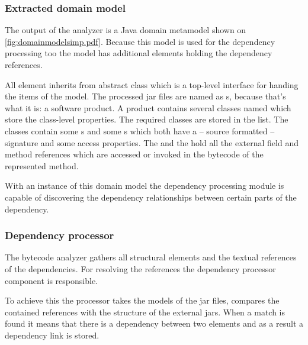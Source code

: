 \subsubsection{Extracted domain model}
The output of the analyzer is a Java domain metamodel shown on
\autoref{fig:domainmodelsimp.pdf}. Because this model is used for the
dependency processing too the model has additional elements holding the
dependency references.

All element inherits from abstract  class which is a top-level
interface for handing the items of the model. The processed jar files are named
as s, because that's what it is: a software product. A product
contains several classes named  which store the class-level
properties. The required classes are stored in the 
list. The classes contain some s and some s which both
have a -- source formatted -- signature and some access properties. The
 and the  hold all the external
field and method references which are accessed or invoked in the bytecode of the
represented method.

With an instance of this domain model the dependency processing module is
capable of discovering the dependency relationships between certain parts of the
dependency.
 

\subsubsection{Dependency processor}
The bytecode analyzer gathers all structural elements and the textual references
of the dependencies. For resolving the references the dependency processor
component is responsible.

To achieve this the processor takes the models of the jar files, compares the
contained references with the structure of the external jars. When a match is
found it means that there is a dependency between two elements and as a result
a dependency link is stored.

